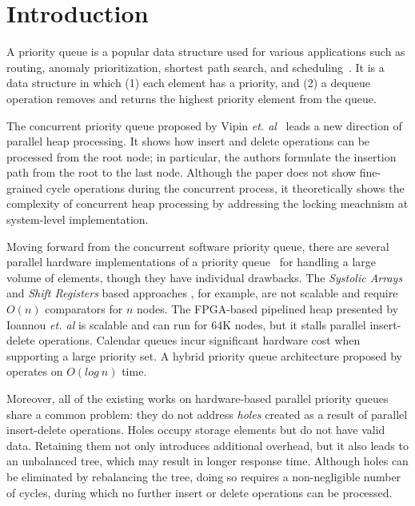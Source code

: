 \section{Introduction}
A priority queue is a popular data structure used for various applications such as routing, anomaly prioritization, shortest path search, and scheduling~\cite{ah1,ah2,ah3}.
It is a data structure in which (1) each element has a priority, and (2) a dequeue operation removes and returns the highest priority element from the queue.

The concurrent priority queue proposed by Vipin {\it et. al}~\cite{pq6} leads a new direction of parallel heap processing. 
It shows how insert and delete operations can be processed from the root node; in particular, the authors formulate the insertion path from the root to the last node. 
Although the paper does not show fine-grained cycle operations during the concurrent process, it theoretically shows the complexity of concurrent heap processing by addressing the locking meachnism at system-level implementation.

Moving forward from the concurrent software priority queue, there are several parallel hardware implementations of a priority queue~\cite{hw1,hw2,hw8,hw9,fpga1,fpga2,fpga3} for handling a large volume of elements, though they have individual drawbacks.
The {\it Systolic Arrays} and {\it Shift Registers} based approaches \cite{hw8,hw9}, for example, are not scalable and require $O(n)$ comparators for $n$ nodes.
The FPGA-based pipelined heap presented by Ioannou {\it et. al} \cite{fpga1} is scalable and can run for 64K nodes, but it stalls parallel insert-delete operations. Calendar queues \cite{hw1} incur significant hardware cost when supporting a large priority set. A hybrid priority queue architecture proposed by \cite{hwsw1} operates on $O(log \ n)$ time.

Moreover, all of the existing works on hardware-based parallel priority queues share a common problem: they do not address {\it holes} created as a result of parallel insert-delete operations. 
Holes occupy storage elements but do not have valid data. 
Retaining them not only introduces additional overhead, but it also leads to an unbalanced tree, which may result in longer response time.
Although holes can be eliminated by rebalancing the tree, doing so requires a non-negligible number of cycles, during which no further insert or delete operations can be processed.

